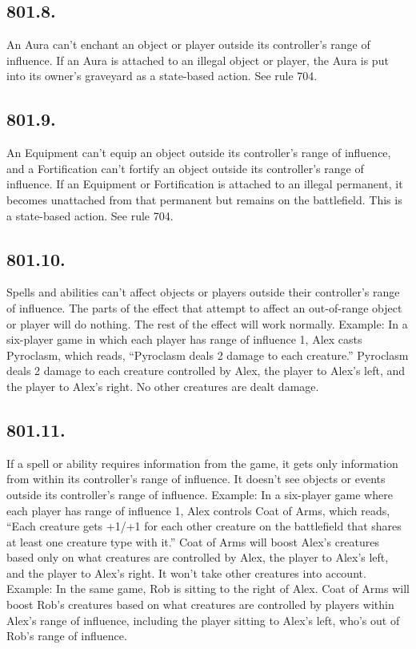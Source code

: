 \subsection*{801.8.}
An Aura can’t enchant an object or player outside its controller’s range of influence. If an Aura is attached to an illegal object or player, the Aura is put into its owner’s graveyard as a state-based action. See rule 704.

\subsection*{801.9.}
An Equipment can’t equip an object outside its controller’s range of influence, and a Fortification can’t fortify an object outside its controller’s range of influence. If an Equipment or Fortification is attached to an illegal permanent, it becomes unattached from that permanent but remains on the battlefield. This is a state-based action. See rule 704.

\subsection*{801.10.}
Spells and abilities can’t affect objects or players outside their controller’s range of influence. The parts of the effect that attempt to affect an out-of-range object or player will do nothing. The rest of the effect will work normally.
Example: In a six-player game in which each player has range of influence 1, Alex casts Pyroclasm, which reads, “Pyroclasm deals 2 damage to each creature.” Pyroclasm deals 2 damage to each creature controlled by Alex, the player to Alex’s left, and the player to Alex’s right. No other creatures are dealt damage.

\subsection*{801.11.}
If a spell or ability requires information from the game, it gets only information from within its controller’s range of influence. It doesn’t see objects or events outside its controller’s range of influence.
Example: In a six-player game where each player has range of influence 1, Alex controls Coat of Arms, which reads, “Each creature gets +1/+1 for each other creature on the battlefield that shares at least one creature type with it.” Coat of Arms will boost Alex’s creatures based only on what creatures are controlled by Alex, the player to Alex’s left, and the player to Alex’s right. It won’t take other creatures into account.
Example: In the same game, Rob is sitting to the right of Alex. Coat of Arms will boost Rob’s creatures based on what creatures are controlled by players within Alex’s range of influence, including the player sitting to Alex’s left, who’s out of Rob’s range of influence.

